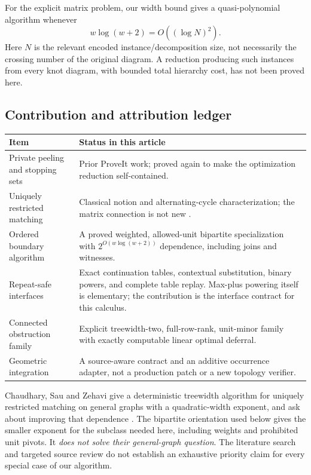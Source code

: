 \documentclass[11pt,a4paper]{article}
\theoremstyle{definition}
\theoremstyle{remark}
\begin{document}
For the explicit matrix problem, our width bound gives a quasi-polynomial
algorithm whenever
\begin{equation}
 w\log(w+2)=O((\log N)^2).
 \label{eq:widthqp}
\end{equation}
Here $N$ is the relevant encoded instance/decomposition size, not
necessarily the crossing number of the original diagram. A reduction
producing such instances from every knot diagram, with bounded total
hierarchy cost, has not been proved here.

\subsection{Contribution and attribution ledger}
\begin{center}\small
\begin{tabular}{p{}p{}}
\toprule
Item & Status in this article \\
\midrule
Private peeling and stopping sets & Prior ProveIt work; proved again to make the optimization reduction self-contained. \\
Uniquely restricted matching & Classical notion and alternating-cycle characterization; the matrix connection is not new \cite{golumbic2001}. \\
Ordered boundary algorithm & A proved weighted, allowed-unit bipartite specialization with $2^{O(w\log(w+2))}$ dependence, including joins and witnesses. \\
Repeat-safe interfaces & Exact continuation tables, contextual substitution, binary powers, and complete table replay. Max-plus powering itself is elementary; the contribution is the interface contract for this calculus. \\
Connected obstruction family & Explicit treewidth-two, full-row-rank, unit-minor family with exactly computable linear optimal deferral. \\
Geometric integration & A source-aware contract and an additive occurrence adapter, not a production patch or a new topology verifier. \\
\bottomrule
\end{tabular}
\end{center}

Chaudhary, Sau and Zehavi give a deterministic treewidth algorithm for
uniquely restricted matching on general graphs with a quadratic-width
exponent, and ask about improving that dependence \cite{csz2025}.
The bipartite orientation used below gives the smaller exponent for the
subclass needed here, including weights and prohibited unit pivots. It
\emph{does not solve their general-graph question}. The literature search
and targeted source review do not establish an exhaustive priority claim
for every special case of our algorithm.
\end{document}
